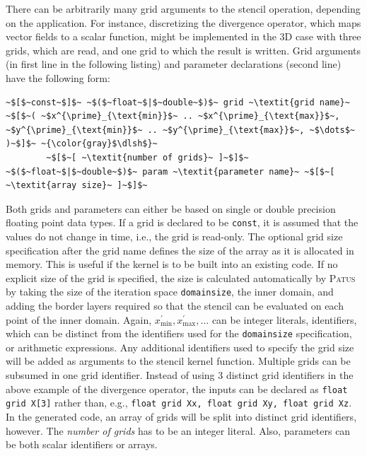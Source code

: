 There can be arbitrarily many grid arguments to the stencil
operation, depending on the application. For instance, discretizing the divergence operator, which maps vector
fields to a scalar function, might be implemented in the 3D case with three grids, which are read, and one grid
to which the result is written.
Grid arguments (in first line in the following listing) and parameter declarations (second line) have the following form:

\begin{lstlisting}[language=stencil]
~$[$~const~$]$~ ~$($~float~$|$~double~$)$~ grid ~\textit{grid name}~ ~$[$~( ~$x^{\prime}_{\text{min}}$~ .. ~$x^{\prime}_{\text{max}}$~, ~$y^{\prime}_{\text{min}}$~ .. ~$y^{\prime}_{\text{max}}$~, ~$\dots$~ )~$]$~ ~{\color{gray}$\dlsh$}~
		~$[$~[ ~\textit{number of grids}~ ]~$]$~
~$($~float~$|$~double~$)$~ param ~\textit{parameter name}~ ~$[$~[ ~\textit{array size}~ ]~$]$~
\end{lstlisting}

Both grids and parameters can either be based on single or double precision floating point data types.
If a grid is declared to be \texttt{const}, it is assumed that the values do not change in time, i.e., the
grid is read-only. The optional grid size specification after the grid name defines the size of the array
as it is allocated in memory. This is useful if the kernel is to be built into an existing code.
If no explicit size of the grid is specified, the size is calculated automatically by \textsc{Patus}
by taking the size of the iteration space \texttt{domainsize}, the inner domain, and adding the border layers required so
that the stencil can be evaluated on each point of the inner domain. Again, $x^{\prime}_{\text{min}}, x^{\prime}_{\text{max}}, \dots$
can be integer literals, identifiers, which can be distinct from the identifiers used for the \texttt{domainsize}
specification, or arithmetic expressions. Any additional identifiers used to specify the grid size will be
added as arguments to the stencil kernel function.
Multiple grids can be subsumed in one grid identifier. Instead of using $3$ distinct grid identifiers
in the above example of the divergence operator, the inputs can be declared as \texttt{float grid X[3]}
rather than, e.g., \texttt{float grid Xx, float grid Xy, float grid Xz}. In the generated code, an array of grids
will be split into distinct grid identifiers, however. The \textit{number of grids} has to be an integer literal.
Also, parameters can be both scalar identifiers or arrays.

